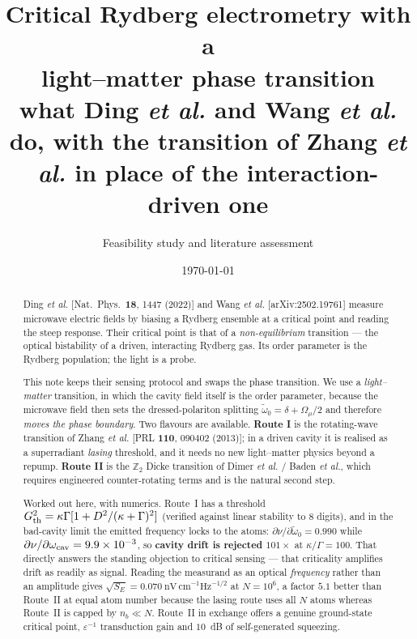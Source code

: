 \documentclass[11pt,a4paper]{article}
\title{\bfseries Critical Rydberg electrometry with a\\[2pt]
\large light--matter phase transition\\[4pt]
\normalsize\mdseries what Ding \emph{et al.} and Wang \emph{et al.} do, with the transition of
Zhang \emph{et al.} in place of the interaction-driven one}
\author{Feasibility study and literature assessment}
\date{\today}
\newcommand{\Omu}{\Omega_{\mu}}
\newcommand{\wt}{\tilde{\omega}_{0}}
\begin{document}
\maketitle

\begin{abstract}
\noindent
Ding \emph{et al.} [Nat.\ Phys.\ \textbf{18}, 1447 (2022)] and Wang \emph{et al.}
[arXiv:2502.19761] measure microwave electric fields by biasing a Rydberg ensemble at a
critical point and reading the steep response. Their critical point is that of a
\emph{non-equilibrium} transition --- the optical bistability of a driven, interacting
Rydberg gas. Its order parameter is the Rydberg population; the light is a probe.

\medskip\noindent
This note keeps their sensing protocol and swaps the phase transition. We use a
\emph{light--matter} transition, in which the cavity field itself is the order parameter,
because the microwave field then sets the dressed-polariton splitting
$\wt=\delta+\Omu/2$ and therefore \emph{moves the phase boundary}. Two flavours are
available. \textbf{Route I} is the rotating-wave transition of Zhang \emph{et al.}
[PRL \textbf{110}, 090402 (2013)]; in a driven cavity it is realised as a superradiant
\emph{lasing} threshold, and it needs no new light--matter physics beyond a repump.
\textbf{Route II} is the $\mathbb{Z}_2$ Dicke transition of Dimer \emph{et al.} /
Baden \emph{et al.}, which requires engineered counter-rotating terms and is the natural
second step.

\medskip\noindent
Worked out here, with numerics. Route~I has a threshold
$G^2_{\rm th}=\kappa\Gamma[1+D^2/(\kappa+\Gamma)^2]$ (verified against linear stability to
8 digits), and in the bad-cavity limit the emitted frequency locks to the atoms:
$\partial\nu/\partial\wt=0.990$ while $\partial\nu/\partial\omega_{\rm cav}=9.9\times10^{-3}$,
so \textbf{cavity drift is rejected $101\times$} at $\kappa/\Gamma=100$. That directly answers
the standing objection to critical sensing --- that criticality amplifies drift as readily as
signal. Reading the measurand as an optical \emph{frequency} rather than an amplitude gives
$\sqrt{S_E}=0.070~\mathrm{nV\,cm^{-1}Hz^{-1/2}}$ at $N=10^6$, a factor $5.1$ better than
Route~II at equal atom number because the lasing route uses all $N$ atoms whereas Route~II is
capped by $n_b\ll N$. Route~II in exchange offers a genuine ground-state critical point,
$\varepsilon^{-1}$ transduction gain and $10$~dB of self-generated squeezing.


\end{abstract}
\end{document}
